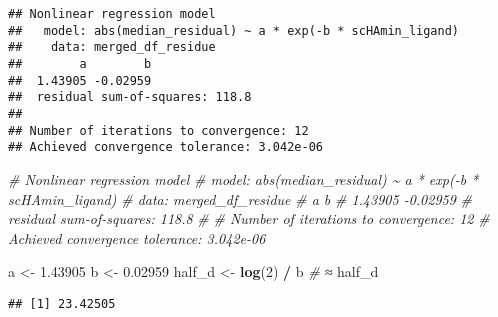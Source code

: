 \documentclass[
]{article}
\newenvironment{Shaded}{\begin{snugshade}}{\end{snugshade}}
\newcommand{\CommentTok}[1]{\textcolor[rgb]{0.56,0.35,0.01}{\textit{#1}}}
\newcommand{\DecValTok}[1]{\textcolor[rgb]{0.00,0.00,0.81}{#1}}
\newcommand{\FloatTok}[1]{\textcolor[rgb]{0.00,0.00,0.81}{#1}}
\newcommand{\FunctionTok}[1]{\textcolor[rgb]{0.13,0.29,0.53}{\textbf{#1}}}
\newcommand{\NormalTok}[1]{#1}
\newcommand{\OtherTok}[1]{\textcolor[rgb]{0.56,0.35,0.01}{#1}}
\newcommand{\SpecialCharTok}[1]{\textcolor[rgb]{0.81,0.36,0.00}{\textbf{#1}}}
\begin{document}
\begin{verbatim}
## Nonlinear regression model
##   model: abs(median_residual) ~ a * exp(-b * scHAmin_ligand)
##    data: merged_df_residue
##        a        b 
##  1.43905 -0.02959 
##  residual sum-of-squares: 118.8
## 
## Number of iterations to convergence: 12 
## Achieved convergence tolerance: 3.042e-06
\end{verbatim}

\begin{Shaded}
\begin{Highlighting}[]
\CommentTok{\# Nonlinear regression model}
\CommentTok{\#   model: abs(median\_residual) \textasciitilde{} a * exp({-}b * scHAmin\_ligand)}
\CommentTok{\#    data: merged\_df\_residue}
\CommentTok{\#        a        b }
\CommentTok{\#  1.43905 {-}0.02959 }
\CommentTok{\#  residual sum{-}of{-}squares: 118.8}
\CommentTok{\# }
\CommentTok{\# Number of iterations to convergence: 12 }
\CommentTok{\# Achieved convergence tolerance: 3.042e{-}06}

\NormalTok{a }\OtherTok{\textless{}{-}} \FloatTok{1.43905}
\NormalTok{b }\OtherTok{\textless{}{-}}  \FloatTok{0.02959} 
\NormalTok{half\_d }\OtherTok{\textless{}{-}} \FunctionTok{log}\NormalTok{(}\DecValTok{2}\NormalTok{) }\SpecialCharTok{/}\NormalTok{ b  }\CommentTok{\# ≈  }
\NormalTok{half\_d}
\end{Highlighting}
\end{Shaded}

\begin{verbatim}
## [1] 23.42505
\end{verbatim}
\end{document}
